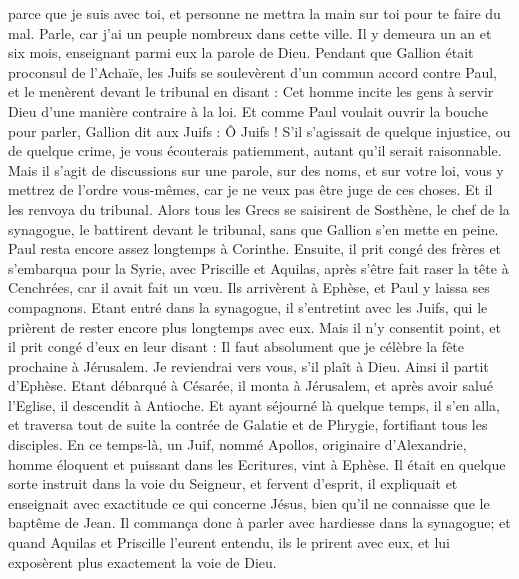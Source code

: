 \begin{multicols}{2}
{{parce que je suis avec toi, et personne ne mettra la main sur toi pour te faire du mal. Parle, car j'ai un peuple nombreux dans cette ville.
Il y demeura un an et six mois, enseignant parmi eux la parole de Dieu.
Pendant que Gallion était proconsul de l'Achaïe, les Juifs se soulevèrent d'un commun accord contre Paul, et le menèrent devant le tribunal
en disant : Cet homme incite les gens à servir Dieu d'une manière contraire à la loi.
Et comme Paul voulait ouvrir la bouche pour parler, Gallion dit aux Juifs : Ô Juifs ! S'il s'agissait de quelque injustice, ou de quelque crime, je vous écouterais patiemment, autant qu'il serait raisonnable.
Mais il s'agit de discussions sur une parole, sur des noms, et sur votre loi, vous y mettrez de l'ordre vous-mêmes, car je ne veux pas être juge de ces choses.
Et il les renvoya du tribunal.
Alors tous les Grecs se saisirent de Sosthène, le chef de la synagogue, le battirent devant le tribunal, sans que Gallion s'en mette en peine.
Paul resta encore assez longtemps à Corinthe. Ensuite, il prit congé des frères et s'embarqua pour la Syrie, avec Priscille et Aquilas, après s'être fait raser la tête à Cenchrées, car il avait fait un vœu.
Ils arrivèrent à Ephèse, et Paul y laissa ses compagnons. Etant entré dans la synagogue, il s'entretint avec les Juifs,
qui le prièrent de rester encore plus longtemps avec eux.
Mais il n'y consentit point, et il prit congé d'eux en leur disant : Il faut absolument que je célèbre la fête prochaine à Jérusalem. Je reviendrai vers vous, s'il plaît à Dieu. Ainsi il partit d'Ephèse.
Etant débarqué à Césarée, il monta à Jérusalem, et après avoir salué l'Eglise, il descendit à Antioche.
Et ayant séjourné là quelque temps, il s'en alla, et traversa tout de suite la contrée de Galatie et de Phrygie, fortifiant tous les disciples.
En ce temps-là, un Juif, nommé Apollos, originaire d'Alexandrie, homme éloquent et puissant dans les Ecritures, vint à Ephèse.
Il était en quelque sorte instruit dans la voie du Seigneur, et fervent d'esprit, il expliquait et enseignait avec exactitude ce qui concerne Jésus, bien qu'il ne connaisse que le baptême de Jean.
Il commança donc à parler avec hardiesse dans la synagogue; et quand Aquilas et Priscille l'eurent entendu, ils le prirent avec eux, et lui exposèrent plus exactement la voie de Dieu.
}}
\end{multicols}
